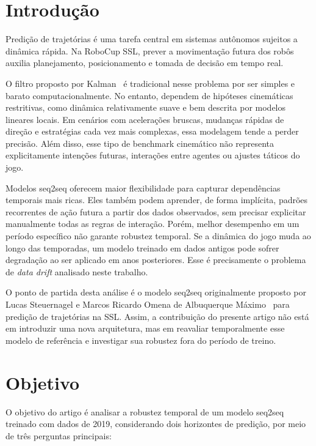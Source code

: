 \documentclass[runningheads]{llncs}
\begin{document}
\section{Introdu\c{c}\~ao}

Predi\c{c}\~ao de trajet\'orias \'e uma tarefa central em sistemas aut\^onomos sujeitos a din\^amica r\'apida. Na RoboCup SSL, prever a movimenta\c{c}\~ao futura dos rob\^os auxilia planejamento, posicionamento e tomada de decis\~ao em tempo real.

O filtro proposto por Kalman~\cite{kalman} \'e tradicional nesse problema por ser simples e barato computacionalmente. No entanto, dependem de hip\'oteses cinem\'aticas restritivas, como din\^amica relativamente suave e bem descrita por modelos lineares locais. Em cen\'arios com acelera\c{c}\~oes bruscas, mudan\c{c}as r\'apidas de dire\c{c}\~ao e estrat\'egias cada vez mais complexas, essa modelagem tende a perder precis\~ao. Al\'em disso, esse tipo de benchmark cinem\'atico n\~ao representa explicitamente inten\c{c}\~oes futuras, intera\c{c}\~oes entre agentes ou ajustes t\'aticos do jogo.

Modelos seq2seq oferecem maior flexibilidade para capturar depend\^encias temporais mais ricas. Eles tamb\'em podem aprender, de forma impl\'icita, padr\~oes recorrentes de a\c{c}\~ao futura a partir dos dados observados, sem precisar explicitar manualmente todas as regras de intera\c{c}\~ao. Por\'em, melhor desempenho em um per\'iodo espec\'ifico n\~ao garante robustez temporal. Se a din\^amica do jogo muda ao longo das temporadas, um modelo treinado em dados antigos pode sofrer degrada\c{c}\~ao ao ser aplicado em anos posteriores. Esse \'e precisamente o problema de \textit{data drift} analisado neste trabalho.

O ponto de partida desta an\'alise \'e o modelo seq2seq originalmente proposto por Lucas Steuernagel e Marcos Ricardo Omena de Albuquerque M\'aximo~\cite{seq2seq} para predi\c{c}\~ao de trajet\'orias na SSL. Assim, a contribui\c{c}\~ao do presente artigo n\~ao est\'a em introduzir uma nova arquitetura, mas em reavaliar temporalmente esse modelo de refer\^encia e investigar sua robustez fora do per\'iodo de treino.

\section{Objetivo}

O objetivo do artigo \'e analisar a robustez temporal de um modelo seq2seq treinado com dados de 2019, considerando dois horizontes de predi\c{c}\~ao, por meio de tr\^es perguntas principais:
\end{document}

